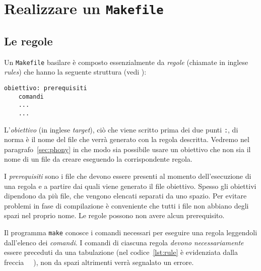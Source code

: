 \cleardoublepage
\chapter{Realizzare un \texttt{Makefile}}
\label{cha:realizzare-makefile}

\section{Le regole}
\label{sec:le-regole}

Un \verb|Makefile| basilare è composto essenzialmente da \emph{regole} (chiamate
in inglese \emph{rules}) che hanno la seguente struttura (vedi
\textcite[3]{gnu:make}):
\begin{lstlisting}[showtabs=true,tab=\rightarrowfill,caption={Struttura di una
regola.},label=lst:rule]
obiettivo: prerequisiti
	comandi
	...
	...
\end{lstlisting}
L'\emph{obiettivo} (in inglese \emph{target}), ciò che viene scritto prima dei
due punti \verb|:|, di norma è il nome del file che verrà generato con la regola
descritta.  Vedremo nel paragrafo~\ref{sec:phony} in che modo sia possibile
usare un obiettivo che non sia il nome di un file da creare eseguendo la
corrispondente regola.

I \emph{prerequisiti} sono i file che devono essere presenti al momento
dell'esecuzione di una regola e a partire dai quali viene generato il file
obiettivo.  Spesso gli obiettivi dipendono da più file, che vengono elencati
separati da uno spazio.  Per evitare problemi in fase di compilazione è
conveniente che tutti i file non abbiano degli spazi nel proprio nome.  Le
regole possono non avere alcun prerequisito.

Il programma \verb|make| conosce i comandi necessari per eseguire una regola
leggendoli dall'elenco dei \emph{comandi}.  I comandi di ciascuna regola
\emph{devono necessariamente} essere preceduti da una tabulazione (nel
codice~\ref{lst:rule} è evidenziata dalla freccia
\lstinline[showtabs=true,tab=\rightarrowfill]{	}), non da spazi altrimenti
verrà segnalato un errore.

